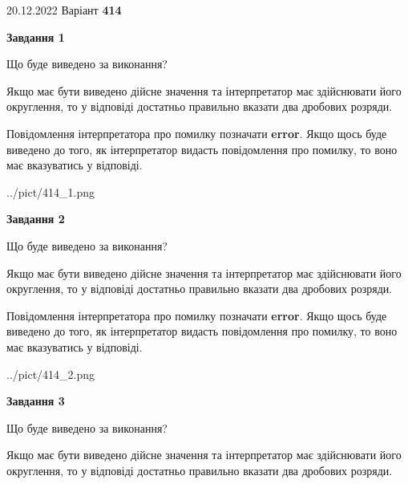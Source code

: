 \documentclass[12pt, ukrainian]{article}
\begin{document}
{20.12.2022 Варіант \No \textbf { 414 }\par}
{
\begin {Large}

{\begin {center}\textbf{Завдання 1}\end {center}}\par
Що буде виведено за виконання? \par

Якщо має бути виведено дійсне значення та інтерпретатор має здійснювати його округлення, 
то у відповіді достатньо правильно вказати два дробових розряди.

Повідомлення інтерпретатора про помилку позначати \textbf{error}.
Якщо щось буде виведено до того, як інтерпретатор видасть повідомлення про помилку, 
то воно має вказуватись у відповіді. \par

\begin{center}
	{../pict/414_1.png}
\end{center}
\newpage

{\begin {center}\textbf{Завдання 2}\end {center}}\par
Що буде виведено за виконання? \par

Якщо має бути виведено дійсне значення та інтерпретатор має здійснювати його округлення, 
то у відповіді достатньо правильно вказати два дробових розряди.

Повідомлення інтерпретатора про помилку позначати \textbf{error}.
Якщо щось буде виведено до того, як інтерпретатор видасть повідомлення про помилку, 
то воно має вказуватись у відповіді. \par

\begin{center}
	{../pict/414_2.png}
\end{center}
\newpage

{\begin {center}\textbf{Завдання 3}\end {center}}\par
Що буде виведено за виконання? \par

Якщо має бути виведено дійсне значення та інтерпретатор має здійснювати його округлення, 
то у відповіді достатньо правильно вказати два дробових розряди.


\end{Large}}
\end{document}
